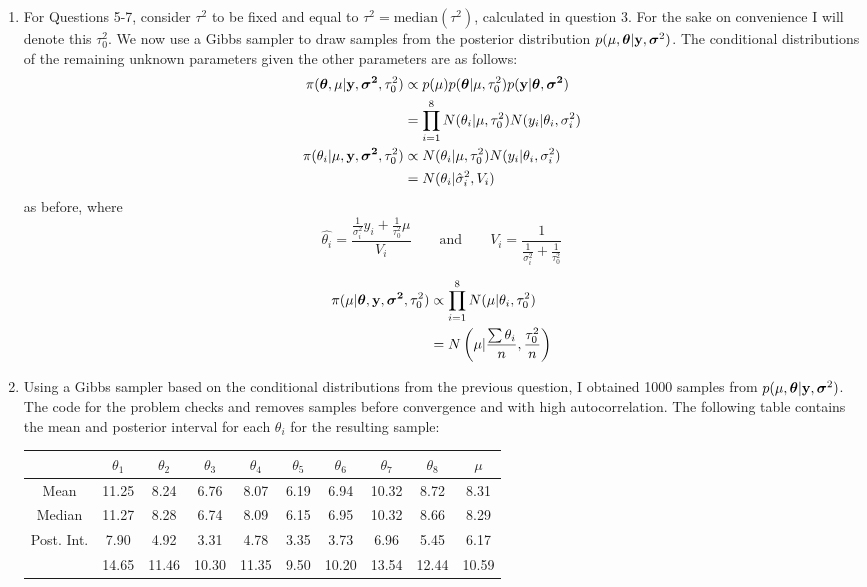 \documentclass[12pt]{article}
\def\y{\mathbf{y}}
\newcommand{\si}{\mbox{\boldmath $\sigma$}}
\newcommand{\bth}{\mbox{\boldmath $\theta$}}
\begin{document}
\begin{enumerate}
	
	\item For Questions 5-7, consider $\tau^2$ to be fixed and equal to $\tau^2 = \mbox{median}(\tau^2)$, calculated in question 3. For the sake on convenience I will denote this $\tau_0^2$. We now use a Gibbs sampler to draw samples from the posterior distribution $p(\mu,\bth|\y,\si^2)$. The conditional distributions of the remaining unknown parameters given the other parameters are as follows:
	\begin{align}
		\pi(\bth, \mu | \mathbf{y}, \mathbf{\si^2}, \tau_0^2) & \propto p(\mu) p(\bth|\mu, \tau_0^2) p(\mathbf{y}| \bth, \mathbf{\si^2}) \nonumber \\
		& = \prod_{i=1}^8 N(\theta_i|\mu, \tau_0^2) N(y_i|\theta_i, \sigma_i^2) \\
		\pi(\theta_i|\mu, \mathbf{y}, \mathbf{\si^2}, \tau_0^2) & \propto N(\theta_i|\mu, \tau_0^2) N(y_i|\theta_i, \sigma_i^2) \nonumber \\
		& = N(\theta_i | \hat{\sigma}_i^2, V_i)
	\end{align}
	as before, where \[\hat{\theta_i} = \dfrac{\frac{1}{\sigma^2_i}y_i + \frac{1}{\tau_0^2}\mu}{V_i} \qquad  \mathrm{ and } \qquad V_i=\dfrac{1}{\frac{1}{\sigma^2_i} + \frac{1}{\tau_0^2}}
	\]
	
	\begin{align}
		\pi(\mu | \bth, \mathbf{y}, \mathbf{\si^2}, \tau_0^2) & \propto \prod_{i=1}^8 N(\mu| \theta_i, \tau_0^2) \nonumber\\
		& =  N\left(\mu \vert \frac{\sum\theta_i}{n} ,  \frac{\tau_0^2}{n}\right)
	\end{align}
	
	\item Using a Gibbs sampler based on the conditional distributions from the previous question, I obtained 1000 samples from $p(\mu,\bth|\y,\si^2)$. The code for the problem checks and removes samples before convergence and with high autocorrelation. The following table contains the mean and posterior interval for each $\theta_i$ for the resulting sample:
	
	\begin{center}
		\begin{tabular}{c|ccccccccc}
	 & $\theta_1$ & $\theta_2$ & $\theta_3$ & $\theta_4$ & $\theta_5$ & $\theta_6$ & $\theta_7$ & $\theta_8$ & $\mu$\\
		\hline
	Mean & 11.25 & 8.24 & 6.76 & 8.07 & 6.19 & 6.94 & 10.32 & 8.72 & 8.31\\
	Median & 11.27 & 8.28 & 6.74 & 8.09 & 6.15 & 6.95 & 10.32 & 8.66 & 8.29\\
	Post. Int. & 7.90 & 4.92 & 3.31 & 4.78 & 3.35 & 3.73 & 6.96 & 5.45 & 6.17\\
	 & 14.65 & 11.46 & 10.30 & 11.35 & 9.50 & 10.20 & 13.54 & 12.44 & 10.59\\
		\end{tabular}
	\end{center}


\end{enumerate}
\end{document}
